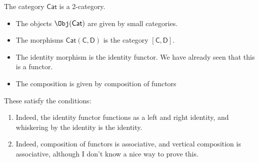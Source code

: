 \documentclass[notes.tex]{subfiles}
\begin{document}
\begin{example}
  The category $\mathsf{Cat}$ is a 2-category.

  \begin{itemize}
    \item The objects $\Obj(\mathsf{Cat})$ are given by small categories.

    \item The morphisms $\mathsf{Cat}(\mathsf{C}, \mathsf{D})$ is the category $[\mathsf{C}, \mathsf{D}]$.

    \item The identity morphism is the identity functor. We have already seen that this is a functor.

    \item The composition is given by composition of functors
  \end{itemize}
  These satisfy the conditions:
  \begin{enumerate}
    \item Indeed, the identity functor functions as a left and right identity, and whiskering by the identity is the identity.

    \item Indeed, composition of functors is associative, and vertical composition is associative, although I don't know a nice way to prove this.
  \end{enumerate}
\end{example}
\end{document}
